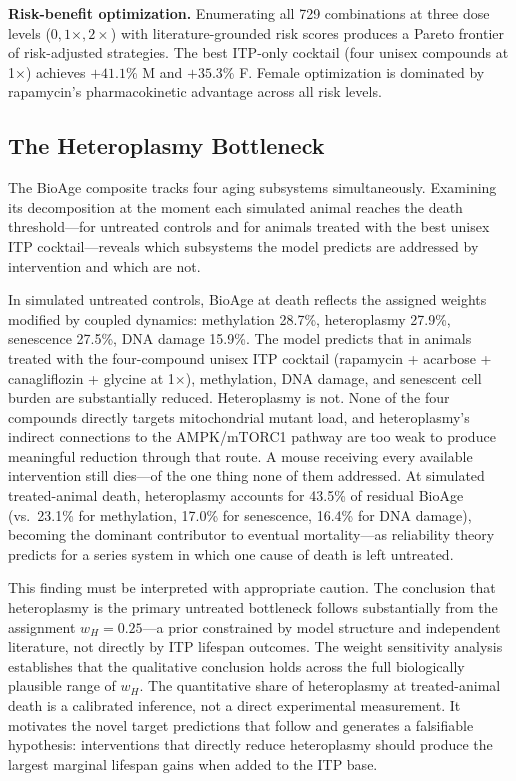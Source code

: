 \documentclass[11pt]{article}
\begin{document}

\textbf{Risk-benefit optimization.} Enumerating all 729 combinations at three dose levels ($0, 1\times, 2\times$) with literature-grounded risk scores produces a Pareto frontier of risk-adjusted strategies. The best ITP-only cocktail (four unisex compounds at 1$\times$) achieves $+41.1\%$ M and $+35.3\%$ F. Female optimization is dominated by rapamycin's pharmacokinetic advantage across all risk levels.


\subsection{The Heteroplasmy Bottleneck}

The BioAge composite tracks four aging subsystems simultaneously. Examining its decomposition at the moment each simulated animal reaches the death threshold---for untreated controls and for animals treated with the best unisex ITP cocktail---reveals which subsystems the model predicts are addressed by intervention and which are not.

In simulated untreated controls, BioAge at death reflects the assigned weights modified by coupled dynamics: methylation 28.7\%, heteroplasmy 27.9\%, senescence 27.5\%, DNA damage 15.9\%. The model predicts that in animals treated with the four-compound unisex ITP cocktail (rapamycin + acarbose + canagliflozin + glycine at 1$\times$), methylation, DNA damage, and senescent cell burden are substantially reduced. Heteroplasmy is not. None of the four compounds directly targets mitochondrial mutant load, and heteroplasmy's indirect connections to the AMPK/mTORC1 pathway are too weak to produce meaningful reduction through that route. A mouse receiving every available intervention still dies---of the one thing none of them addressed. At simulated treated-animal death, heteroplasmy accounts for 43.5\% of residual BioAge (vs.\ 23.1\% for methylation, 17.0\% for senescence, 16.4\% for DNA damage), becoming the dominant contributor to eventual mortality---as reliability theory predicts for a series system in which one cause of death is left untreated.


This finding must be interpreted with appropriate caution. The conclusion that heteroplasmy is the primary untreated bottleneck follows substantially from the assignment $w_H = 0.25$---a prior constrained by model structure and independent literature, not directly by ITP lifespan outcomes. The weight sensitivity analysis establishes that the qualitative conclusion holds across the full biologically plausible range of $w_H$. The quantitative share of heteroplasmy at treated-animal death is a calibrated inference, not a direct experimental measurement. It motivates the novel target predictions that follow and generates a falsifiable hypothesis: interventions that directly reduce heteroplasmy should produce the largest marginal lifespan gains when added to the ITP base.
\end{document}
